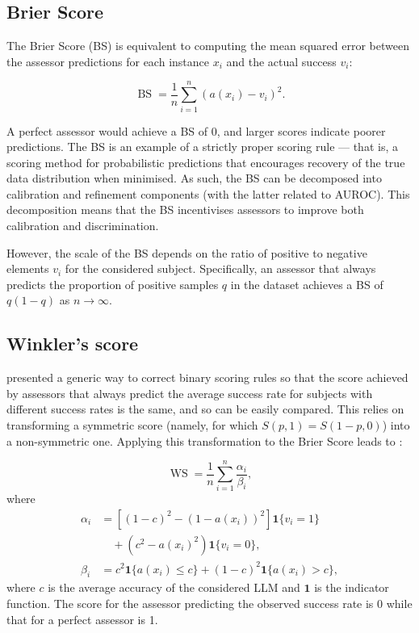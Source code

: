 \documentclass[11pt]{article}
\begin{document}
\subsection{Brier Score}
\label{app:metrics_brier}
The Brier Score (BS) is equivalent to computing the mean squared error between the assessor predictions for each instance $x_i$ and the actual success $v_i$:

\[
\operatorname{BS} =  \frac{1}{n} \sum_{i=1}^n \left(a(x_i) - v_i\right)^2.
\]

A perfect assessor would achieve a BS of 0, and larger scores indicate poorer predictions. The BS is an example of a strictly proper scoring rule \cite{gneiting2007strictly} — that is, a scoring method for probabilistic predictions that encourages recovery of the true data distribution when minimised. As such, the BS can be decomposed into calibration and refinement components (with the latter related to AUROC). This decomposition means that the BS incentivises assessors to improve both calibration and discrimination.

However, the scale of the BS depends on the ratio of positive to negative elements $v_i$ for the considered subject. Specifically, an assessor that always predicts the proportion of positive samples $q$ in the dataset achieves a BS of $q(1 - q)$ as $n \to \infty$.%

\subsection{Winkler's score}
\label{app:metrics_winkler}
\citet{winkler} presented a generic way to correct binary scoring rules so that the score achieved by assessors that always predict the average success rate for subjects with different success rates is the same, and so can be easily compared. This relies on transforming a symmetric score (namely, for which $S(p,1)= S(1-p,0)$) into a non-symmetric one. Applying this transformation to the Brier Score leads to \cite[Sec. 3.2]{gneiting2007strictly}: 

\[
    \operatorname{WS} = 
    \frac{1}{n} \sum_{i=1}^n \frac{\alpha_i}{\beta_i},  
\]
where
\[
\begin{aligned}
    \alpha_i &= [(1-c)^2 - (1-a(x_i))^2 ]\mathbf{1}\{v_i=1\} \\&\quad + (c^2 - a(x_i)^2 )\mathbf{1}\{v_i=0\},\\
    \beta_i &= c^2 \mathbf{1}\{a(x_i)\le c\} + (1-c)^2 \mathbf{1}\{a(x_i)> c\},
\end{aligned}
\]
where $ c $ is the average accuracy of the considered LLM and $\mathbf{1}$ is the indicator function. 
 The score for the assessor predicting the observed success rate is 0 while that for a perfect assessor is 1.
\end{document}
